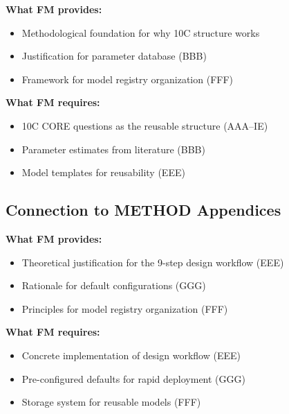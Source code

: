 \begin{tcolorbox}[colback=yellow!5!white, colframe=yellow!75!black,
    title=Integration: FM $\leftrightarrow$ CORE Appendices]
\textbf{What FM provides:}
\begin{itemize}[nosep]
\item Methodological foundation for why 10C structure works
\item Justification for parameter database (BBB)
\item Framework for model registry organization (FFF)
\end{itemize}

\textbf{What FM requires:}
\begin{itemize}[nosep]
\item 10C CORE questions as the reusable structure (AAA--IE)
\item Parameter estimates from literature (BBB)
\item Model templates for reusability (EEE)
\end{itemize}
\end{tcolorbox}

\subsection{Connection to METHOD Appendices}

\begin{tcolorbox}[colback=yellow!5!white, colframe=yellow!75!black,
    title=Integration: FM $\leftrightarrow$ METHOD Appendices]
\textbf{What FM provides:}
\begin{itemize}[nosep]
\item Theoretical justification for the 9-step design workflow (EEE)
\item Rationale for default configurations (GGG)
\item Principles for model registry organization (FFF)
\end{itemize}

\textbf{What FM requires:}
\begin{itemize}[nosep]
\item Concrete implementation of design workflow (EEE)
\item Pre-configured defaults for rapid deployment (GGG)
\item Storage system for reusable models (FFF)
\end{itemize}
\end{tcolorbox}


